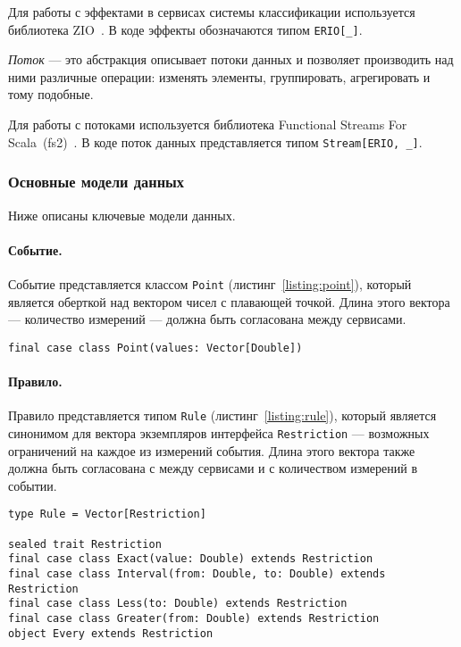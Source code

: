 \documentclass[14pt]{article}
\begin{document}
Для работы с эффектами в сервисах системы классификации используется библиотека ZIO~\cite{zio}. В коде эффекты обозначаются типом \verb|ERIO[_]|.

\emph{Поток} --- это абстракция описывает потоки данных и позволяет производить над ними различные операции: изменять элементы, группировать, агрегировать и тому подобные.

Для работы с потоками используется библиотека Functional Streams For Scala~(fs2)~\cite{fs2}. В коде поток данных представляется типом \verb|Stream[ERIO, _]|.

\subsubsection{Основные модели данных}
Ниже описаны ключевые модели данных.
\paragraph{Событие.} Событие представляется классом \verb|Point| (листинг~\ref{listing:point}), который является оберткой над вектором чисел с плавающей точкой. Длина этого вектора --- количество измерений --- должна быть согласована между сервисами.

\begin{lstlisting}[style=scalaStyle,caption={Класс, описывающий событие.},label={listing:point},captionpos=b, float]
final case class Point(values: Vector[Double])
\end{lstlisting}

\paragraph{Правило.}
Правило представляется типом \verb|Rule| (листинг~\ref{listing:rule}), который является синонимом для вектора экземпляров интерфейса \verb|Restriction| --- возможных ограничений на каждое из измерений события. Длина этого вектора также должна быть согласована с между сервисами и с количеством измерений в событии.

\begin{lstlisting}[style=scalaStyle,caption={Тип, описывающий правило.},label={listing:rule},captionpos=b, float]
type Rule = Vector[Restriction]

sealed trait Restriction
final case class Exact(value: Double) extends Restriction
final case class Interval(from: Double, to: Double) extends Restriction
final case class Less(to: Double) extends Restriction
final case class Greater(from: Double) extends Restriction
object Every extends Restriction
\end{lstlisting}
\end{document}
